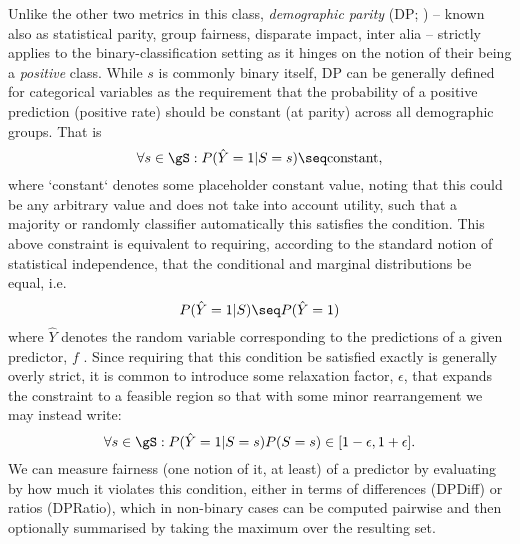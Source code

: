 %
Unlike the other two metrics in this class, \emph{demographic parity} (DP; \cite{zemel2013learning,
feldman2015certifying}) -- known also as statistical parity, group fairness, disparate impact,
inter alia -- strictly applies to the binary-classification setting as it hinges on the notion of
their being a \emph{positive} class.
%
While \(s\) is commonly binary itself, DP can be generally defined for categorical variables as the
requirement that the probability of a positive prediction (positive rate) should be constant (at
parity) across all demographic groups. 
%
That is
%
\begin{equation}
    \forall s \in \gS: P( \hat{Y} = 1 | S = s ) \seq \text{constant},
\end{equation}
%
where `constant` denotes some placeholder constant value, noting that this could be any arbitrary
value and does not take into account utility, such that a majority or randomly classifier
automatically this satisfies the condition. 
%
This above constraint is equivalent to requiring, according to the standard notion of statistical
independence, that the conditional and marginal distributions be equal, i.e.
%
\begin{equation}
    P( \hat{Y} = 1 | S) \seq P( \hat{Y} = 1 )
\end{equation}
%
where \(\hat{Y}\) denotes the random variable corresponding to the predictions of a given
predictor, \(f\) .
%
Since requiring that this condition be satisfied exactly is generally overly strict, it is common
to introduce some relaxation factor, \(\epsilon\), that expands the constraint to a feasible
region so that with some minor rearrangement we may instead write:
%
\begin{equation}
    \forall s \in \gS: P(\hat{Y}=1|S=s) P(S=s) \in [ 1 - \epsilon, 1 + \epsilon ]. 
%
\end{equation}
%
We can measure fairness (one notion of it, at least) of a predictor by evaluating by how much it
violates this condition, either in terms of differences (DPDiff) or ratios (DPRatio), which in
non-binary cases can be computed pairwise and then optionally summarised by taking the maximum over
the resulting set.

